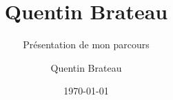 \documentclass[9pt]{beamer}
\title{Quentin Brateau}
\subtitle{Présentation de mon parcours}
\author{Quentin Brateau}
\institute{\texttt{[image: images/logo\_ensta.jpg]}}
\date{\today}
\begin{document}
	\titlepage
	
	
	
	
	
	

	\titlepage
\end{document}
